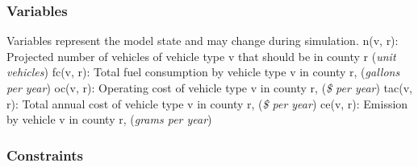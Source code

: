 \documentclass[answers]{exam}
\begin{document}
\subsubsection{Variables} 
\begin{outline} 
\1 Variables represent the model state and may change during simulation.
\2 n(v, r): Projected number of vehicles of vehicle type v that should be in county r (\textit{unit vehicles}) 
\2 fc(v, r): Total fuel consumption by vehicle type v in county r, (\textit{gallons per year}) 
\2 oc(v, r): Operating cost of vehicle type v in county r, (\textit{\$ per year})
\2 tac(v, r): Total annual cost of vehicle type v in county r, (\textit{\$ per year})
\2 ce(v, r): Emission by vehicle v in county r, (\textit{grams per year})

\end{outline}
\subsubsection{Constraints}
\end{document}
